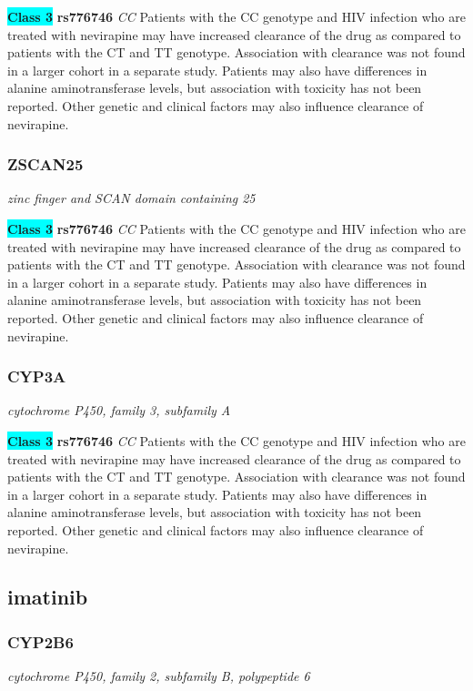 \documentclass{report}
\begin{document}
\textbf{\colorbox{cyan} {Class 3}} \textbf{ rs776746 } \textit{ CC }
Patients with the CC genotype and HIV infection who are treated with nevirapine may have increased clearance of the drug as compared to patients with the CT and TT genotype. Association with clearance was not found in a larger cohort in a separate study. Patients may also have differences in alanine aminotransferase levels, but association with toxicity has not been reported. Other genetic and clinical factors may also influence clearance of nevirapine.\newline\subsubsection{ ZSCAN25 }
\textit{ zinc finger and SCAN domain containing 25 }

\textbf{\colorbox{cyan} {Class 3}} \textbf{ rs776746 } \textit{ CC }
Patients with the CC genotype and HIV infection who are treated with nevirapine may have increased clearance of the drug as compared to patients with the CT and TT genotype. Association with clearance was not found in a larger cohort in a separate study. Patients may also have differences in alanine aminotransferase levels, but association with toxicity has not been reported. Other genetic and clinical factors may also influence clearance of nevirapine.\newline\subsubsection{ CYP3A }
\textit{ cytochrome P450, family 3, subfamily A }

\textbf{\colorbox{cyan} {Class 3}} \textbf{ rs776746 } \textit{ CC }
Patients with the CC genotype and HIV infection who are treated with nevirapine may have increased clearance of the drug as compared to patients with the CT and TT genotype. Association with clearance was not found in a larger cohort in a separate study. Patients may also have differences in alanine aminotransferase levels, but association with toxicity has not been reported. Other genetic and clinical factors may also influence clearance of nevirapine.\newline\subsection{ imatinib }\subsubsection{ CYP2B6 }
\textit{ cytochrome P450, family 2, subfamily B, polypeptide 6 }
\end{document}
